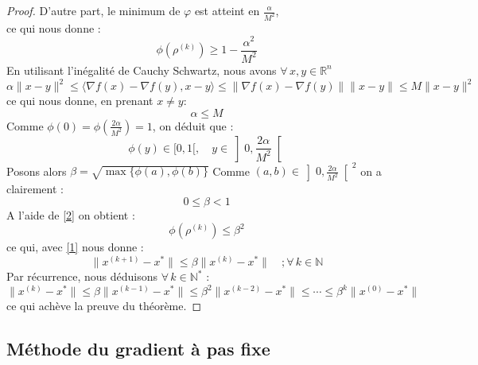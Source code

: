 \documentclass[12pt,a4paper,openay]{book}
\numberwithin{equation}{chapter}
\newcommand{\al}{\alpha}
\newcommand{\N}{\mathbb{N}}
\newcommand{\R}{\mathbb{R}}
\newcommand{\xks}{x^{(k+1)}}
\newcommand{\rok}{\rho^{(k)}}
\newcommand{\gf}{\nabla f(x)}
\let\oldforall\forall
\renewcommand{\forall}{\oldforall\,}
\begin{document}
\begin{proof}
		
		D'autre part, le minimum de $\varphi$ est atteint en $\frac{\alpha}{M^{2}}$,\\
		ce qui nous donne :
		\begin{equation}
		\phi (\rok)\geq 1-\frac{\alpha^2}{M^2} \label{3}
		\end{equation}
		En utilisant l'in\'egalit\'e de Cauchy Schwartz, nous avons $\forall x,y\in\R^n$
		$$\alpha\|x-y\|^2\leq \langle \gf -\nabla f(y), x-y\rangle \leq \|\gf -\nabla f(y)\| \|x-y\|\leq M\|x-y\|^2$$
		ce qui nous donne, en prenant $x\neq y$:
		\begin{equation}
		\alpha \leq M \label{4}
		\end{equation}
		Comme $\phi(0)=\phi \left(\frac{2\al}{M^2} \right)=1$, on d\'eduit que :		
		$$\phi(y)\in [0,1[,\quad y\in \left]0,\frac{2\al}{M^2}\right[$$
		Posons alors $\beta =\sqrt{\max\{\phi(a),\phi(b) \}}$
		Comme $(a,b)\in \left]0,\frac{2\al}{M^2}\right[^2$ on a clairement :
		$$0\leq \beta< 1$$
		A l'aide de \eqref{2} on obtient :
		$$\phi(\rok)\le \beta^2$$
		ce qui, avec \eqref{1} nous donne :
		$$\|\xks -x^*\| \leq \beta \|x^{(k)} -x^*\|\quad; \forall k\in \N$$
		Par r\'ecurrence, nous d\'eduisons $\forall k\in \N^*$ :
		$$\|x^{(k)} -x^*\| \leq \beta \|x^{(k-1)}-x^*\| \leq \beta^2 \|x^{(k-2)} -x^*\| \leq \cdots \leq \beta^k \|x^{(0)}-x^*\|$$
		ce qui ach\`eve la preuve du th\'eor\`eme.			
	\end{proof}
		
			
	
	\subsection{M\'ethode du gradient \`a pas fixe}
	
\end{document}
